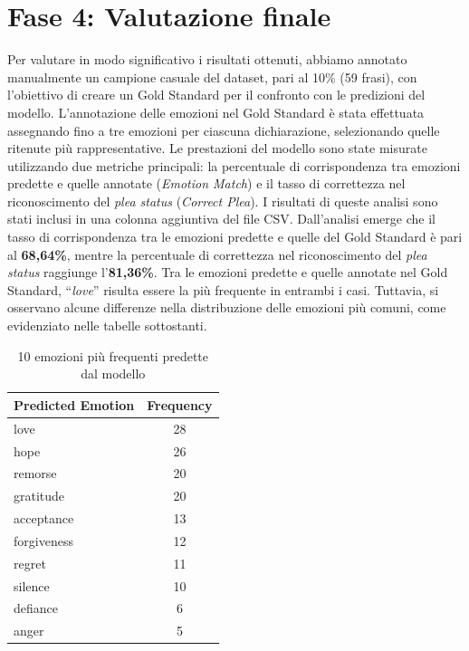 \documentclass[11pt]{article}
\begin{document}
\section{Fase 4: Valutazione finale}
Per valutare in modo significativo i risultati ottenuti, abbiamo annotato manualmente un campione casuale del dataset, pari al 10\% (59 frasi), con l’obiettivo di creare un Gold Standard per il confronto con le predizioni del modello.
L’annotazione delle emozioni nel Gold Standard è stata effettuata assegnando fino a tre emozioni per ciascuna dichiarazione, selezionando quelle ritenute più rappresentative.
Le prestazioni del modello sono state misurate utilizzando due metriche principali: la percentuale di corrispondenza tra emozioni predette e quelle annotate (\textit{Emotion Match}) e il tasso di correttezza nel riconoscimento del \textit{plea status} (\textit{Correct Plea}). I risultati di queste analisi sono stati inclusi in una colonna aggiuntiva del file CSV.
Dall’analisi emerge che il tasso di corrispondenza tra le emozioni predette e quelle del Gold Standard è pari al \textbf{68,64\%}, mentre la percentuale di correttezza nel riconoscimento del \textit{plea status} raggiunge l’\textbf{81,36\%}.
Tra le emozioni predette e quelle annotate nel Gold Standard, “\textit{love}” risulta essere la più frequente in entrambi i casi. Tuttavia, si osservano alcune differenze nella distribuzione delle emozioni più comuni, come evidenziato nelle tabelle sottostanti.

\begin{table}[H]
\centering
\begin{tabular}{|l|c|}
\hline
\textbf{Predicted Emotion} & \textbf{Frequency} \\ \hline
love           & 28 \\ \hline
hope           & 26 \\ \hline
remorse        & 20 \\ \hline
gratitude      & 20 \\ \hline
acceptance     & 13 \\ \hline
forgiveness    & 12 \\ \hline
regret         & 11 \\ \hline
silence        & 10 \\ \hline
defiance        & 6  \\ \hline
anger           & 5  \\ \hline
\end{tabular}
\caption{10 emozioni più frequenti predette dal modello}
\label{tab:predicted_emotions}
\end{table}
\end{document}
